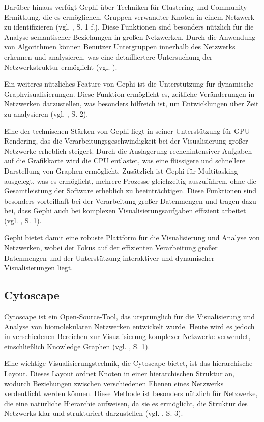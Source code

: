 Darüber hinaus verfügt Gephi über Techniken für Clustering und Community Ermittlung, die es ermöglichen, Gruppen verwandter Knoten in einem Netzwerk zu identifizieren (vgl. \cite{gephi:Bastian}, S. 1 f.). Diese Funktionen sind besonders nützlich für die Analyse semantischer Beziehungen in großen Netzwerken. Durch die Anwendung von Algorithmen können Benutzer Untergruppen innerhalb des Netzwerks erkennen und analysieren, was eine detailliertere Untersuchung der Netzwerkstruktur ermöglicht (vgl. \cite{clusteringGraph:yWorks}).

Ein weiteres nützliches Feature von Gephi ist die Unterstützung für dynamische Graphvisualisierungen. Diese Funktion ermöglicht es, zeitliche Veränderungen in Netzwerken darzustellen, was besonders hilfreich ist, um Entwicklungen über Zeit zu analysieren (vgl. \cite{gephi:Bastian}, S. 2).

Eine der technischen Stärken von Gephi liegt in seiner Unterstützung für GPU-Rendering, das die Verarbeitungsgeschwindigkeit bei der Visualisierung großer Netzwerke erheblich steigert. Durch die Auslagerung rechenintensiver Aufgaben auf die Grafikkarte wird die CPU entlastet, was eine flüssigere und schnellere Darstellung von Graphen ermöglicht. Zusätzlich ist Gephi für Multitasking ausgelegt, was es ermöglicht, mehrere Prozesse gleichzeitig auszuführen, ohne die Gesamtleistung der Software erheblich zu beeinträchtigen. Diese Funktionen sind besonders vorteilhaft bei der Verarbeitung großer Datenmengen und tragen dazu bei, dass Gephi auch bei komplexen Visualisierungsaufgaben effizient arbeitet (vgl. \cite{gephi:Bastian}, S. 1).

Gephi bietet damit eine robuste Plattform für die Visualisierung und Analyse von Netzwerken, wobei der Fokus auf der effizienten Verarbeitung großer Datenmengen und der Unterstützung interaktiver und dynamischer Visualisierungen liegt.

\subsection{Cytoscape}

Cytoscape ist ein Open-Source-Tool, das ursprünglich für die Visualisierung und Analyse von biomolekularen Netzwerken entwickelt wurde. Heute wird es jedoch in verschiedenen Bereichen zur Visualisierung komplexer Netzwerke verwendet, einschließlich Knowledge Graphen (vgl. \cite{cytoscape:Shannon}, S. 1).

Eine wichtige Visualisierungstechnik, die Cytoscape bietet, ist das hierarchische Layout. Dieses Layout ordnet Knoten in einer hierarchischen Struktur an, wodurch Beziehungen zwischen verschiedenen Ebenen eines Netzwerks verdeutlicht werden können. Diese Methode ist besonders nützlich für Netzwerke, die eine natürliche Hierarchie aufweisen, da sie es ermöglicht, die Struktur des Netzwerks klar und strukturiert darzustellen (vgl. \cite{cytoscape:Shannon}, S. 3).

